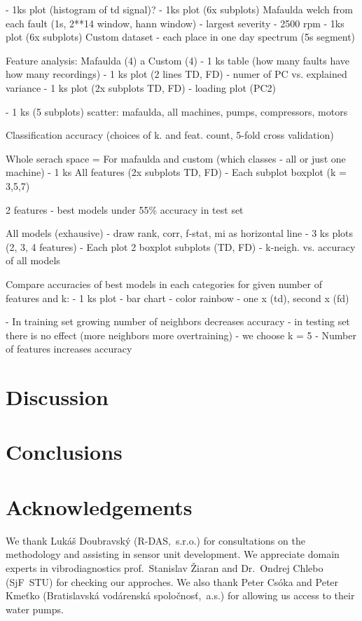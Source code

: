 \documentclass{llncs}
\begin{document}
- 1ks plot (histogram of td signal)?
- 1ks plot (6x subplots) Mafaulda welch from each fault (1s, 2**14 window, hann window)  - largest severity - 2500 rpm
- 1ks plot (6x subplots) Custom dataset - each place in one day spectrum (5s segment)

Feature analysis:
Mafaulda (4) a Custom (4) 
- 1 ks table (how many faults have how many recordings)
- 1 ks plot (2 lines TD, FD) - numer of PC vs. explained variance
- 1 ks plot (2x subplots TD, FD) - loading plot (PC2)

- 1 ks (5 subplots) scatter: mafaulda, all machines, pumps, compressors, motors


Classification accuracy (choices of k. and feat. count, 5-fold cross validation)

Whole serach space = For mafaulda and custom (which classes - all or just one machine)
- 1 ks All features (2x subplots TD, FD)
	- Each subplot boxplot (k = 3,5,7)

2 features - best models under 55\% accuracy in test set

All models (exhausive) - draw rank, corr, f-stat, mi as horizontal line
	- 3 ks plots (2, 3, 4 features)
		- Each plot 2 boxplot subplots (TD, FD) - k-neigh. vs. accuracy of all models


Compare accuracies of best models in each categories for given number of features and k:
- 1 ks plot - bar chart - color rainbow - one x (td), second x (fd)



- In training set growing number of neighbors decreases accuracy - in testing set there is no effect (more neighbors more overtraining)
	- we choose k = 5
- Number of features increases accuracy


\section{Discussion}

\section{Conclusions}


\section*{Acknowledgements}
We thank Lukáš Doubravský (R-DAS,~s.r.o.) for consultations on the methodology and assisting in sensor unit development. We appreciate domain experts in vibrodiagnostics prof.~Stanislav Žiaran and Dr.~Ondrej Chlebo (SjF~STU) for checking our approches. We also thank Peter Csóka and Peter Kmeťko (Bratislavská vodárenská spoločnosť,~a.s.) for allowing us access to their water pumps.

\printbibliography
\end{document}
